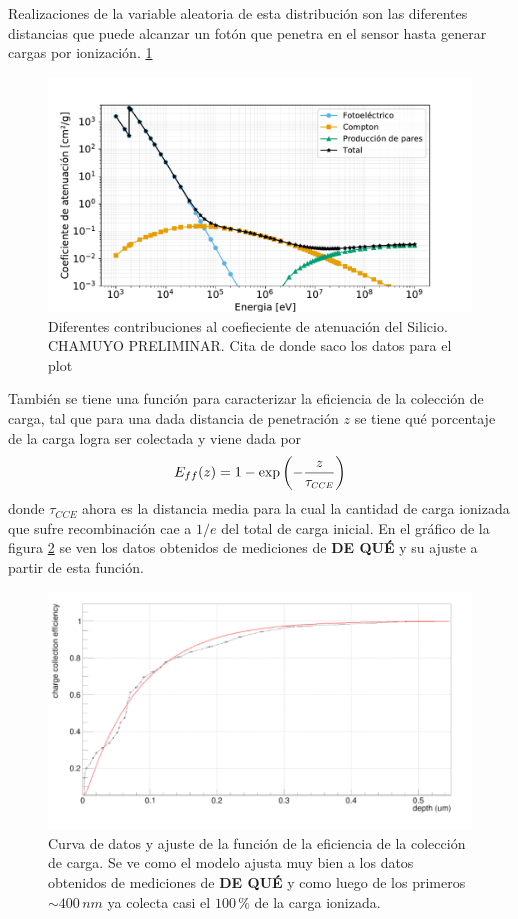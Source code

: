 Realizaciones de la variable aleatoria de esta distribución son las diferentes distancias que puede alcanzar un fotón que penetra en el sensor hasta generar cargas por ionización.
 \ref{fig:FotoelectricoComptonPares}
\begin{figure}[h]
    \centering
        \includegraphics[scale=0.5]{Figs/FotoelectricoComptonPares_enSilicio.pdf}
    \caption{\footnotesize{Diferentes contribuciones al coefieciente de atenuación del Silicio. CHAMUYO PRELIMINAR. Cita\cite{FotoComptPar} de donde saco los datos para el plot}}
    \label{fig:FotoelectricoComptonPares}
\end{figure}
También se tiene una función para caracterizar la eficiencia de la colección de carga, tal que para una dada distancia de penetración $z$ se tiene qué porcentaje de la carga logra ser colectada y viene dada por
\begin{equation*}
    E_{ff}(z) = 1 - 
    \exp
    \left(
        -\frac{z}{\tau_{\scaleto{CCE}{4pt}}}
    \right)
\end{equation*}
donde $\tau_{CCE}$ ahora es la distancia media para la cual la cantidad de carga ionizada que sufre recombinación cae a $1/e$ del total de carga inicial. En el gráfico de la figura \ref{fig:EficienciaCC} se ven los datos obtenidos de mediciones de \textbf{DE QUÉ} y su ajuste a partir de esta función.
\begin{figure}[H]
    \centering
        \includegraphics[scale=0.4]{pngs/CCE_plot.png}
    \caption{\footnotesize{Curva de datos y ajuste de la función de la eficiencia de la colección de carga. Se ve como el modelo ajusta muy bien a los datos obtenidos de mediciones de \textbf{DE QUÉ} y como luego de los primeros $\sim 400\,\si{nm}$ ya colecta casi el $100\,\%$ de la carga ionizada.}}
    \label{fig:EficienciaCC}
\end{figure}
